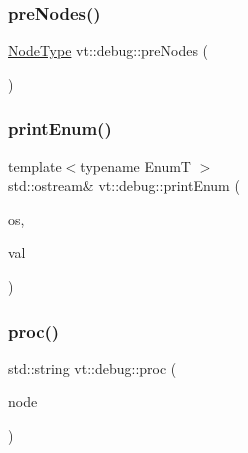 \mbox{\label{namespacevt_1_1debug_ab9a204b679ea705a255d3cb4dcce02f3}} 
\subsubsection{\texorpdfstring{pre\+Nodes()}{preNodes()}}
{\footnotesize\ttfamily \hyperlink{namespacevt_a866da9d0efc19c0a1ce79e9e492f47e2}{Node\+Type} vt\+::debug\+::pre\+Nodes (\begin{DoxyParamCaption}{ }\end{DoxyParamCaption})}

\mbox{\label{namespacevt_1_1debug_afaa2c8383e718071689dfea2c959a467}} 
\subsubsection{\texorpdfstring{print\+Enum()}{printEnum()}}
{\footnotesize\ttfamily template$<$typename EnumT $>$ \\
std\+::ostream\& vt\+::debug\+::print\+Enum (\begin{DoxyParamCaption}\item[{std\+::ostream \&}]{os,  }\item[{EnumT const \&}]{val }\end{DoxyParamCaption})\hspace{0.3cm}{\ttfamily [inline]}}

\mbox{\label{namespacevt_1_1debug_a13a11e278ff8e5a4093396437511aeb7}} 
\subsubsection{\texorpdfstring{proc()}{proc()}}
{\footnotesize\ttfamily std\+::string vt\+::debug\+::proc (\begin{DoxyParamCaption}\item[{\hyperlink{namespacevt_a866da9d0efc19c0a1ce79e9e492f47e2}{vt\+::\+Node\+Type} const \&}]{node }\end{DoxyParamCaption})\hspace{0.3cm}{\ttfamily [inline]}}

